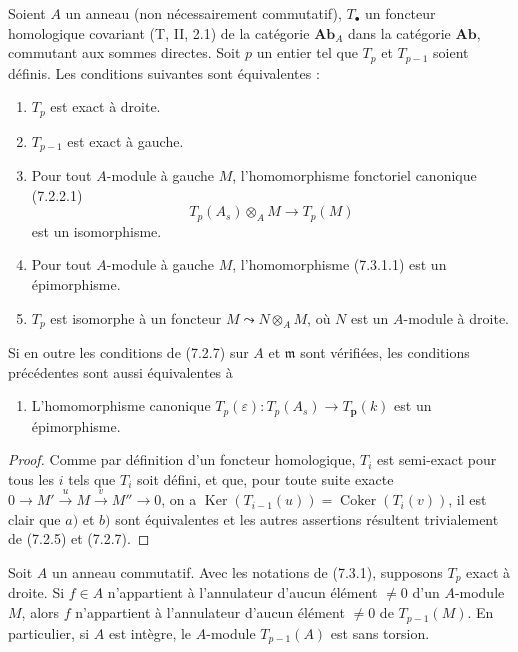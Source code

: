 \begin{proposition}[7.3.1]
Soient $A$ un anneau (non nécessairement commutatif), $T_\bullet$ un foncteur
homologique covariant \textup{(T, II, 2.1)} de la catégorie $\boldsymbol{Ab}_A$ dans la
catégorie $\boldsymbol{Ab}$, commutant aux sommes directes. Soit $p$ un entier tel
que $T_p$ et $T_{p-1}$ soient définis. Les conditions suivantes sont
équivalentes :
\begin{enumerate}
  \item[a)] $T_p$ est exact à droite.
  \item[b)] $T_{p-1}$ est exact à gauche.
  \item[c)] Pour tout $A$-module à gauche $M$, l'homomorphisme fonctoriel
    canonique \textup{(7.2.2.1)}
    \[
      T_p(A_s)\otimes_A M\longrightarrow T_p(M)
      \tag{7.3.1.1}\label{III.7.3.1.1.fr}
    \]
    est un isomorphisme.
  \item[d)] Pour tout $A$-module à gauche $M$, l'homomorphisme \textup{(7.3.1.1)} est
    un épimorphisme.
  \item[e)] $T_p$ est isomorphe à un foncteur
    $M\leadsto N\otimes_A M$, où $N$ est un $A$-module à droite.
\end{enumerate}

Si en outre les conditions de \textup{(7.2.7)} sur $A$ et $\mathfrak m$ sont vérifiées,
les conditions précédentes sont aussi équivalentes à
\begin{enumerate}
  \item[f)] L'homomorphisme canonique
    $T_p(\varepsilon):T_p(A_s)\longrightarrow T_{\boldsymbol{p}}(k)$
    est un épimorphisme.
\end{enumerate}
\end{proposition}

\begin{proof}
Comme par définition d'un foncteur homologique, $T_i$ est semi-exact pour tous
les $i$ tels que $T_i$ soit défini, et que, pour toute suite exacte
$0\longrightarrow M'\xrightarrow{u}M\xrightarrow{v}M''\longrightarrow0$,
on a
$\operatorname{Ker}(T_{i-1}(u))=\operatorname{Coker}(T_i(v))$,
il est clair que $a)$ et $b)$ sont équivalentes et les autres assertions
résultent trivialement de (7.2.5) et (7.2.7).
\end{proof}

\begin{corollary}[7.3.2]
Soit $A$ un anneau commutatif. Avec les notations de \textup{(7.3.1)}, supposons $T_p$
exact à droite. Si $f\in A$ n'appartient à l'annulateur d'aucun élément
$\ne0$ d'un $A$-module $M$, alors $f$ n'appartient à l'annulateur d'aucun
élément $\ne0$ de $T_{p-1}(M)$. En particulier, si $A$ est intègre, le
$A$-module $T_{p-1}(A)$ est sans torsion.
\end{corollary}

